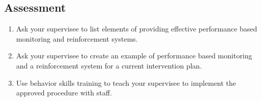 \subsection{Assessment}
\begin{enumerate}
\item Ask your supervisee to list elements of providing effective performance based monitoring and reinforcement systems. 
\item Ask your supervisee to create an example of performance based monitoring and a reinforcement system for a current intervention plan.
\item Use behavior skills training to teach your supervisee to implement the approved procedure with staff. 
%
\end{enumerate}
%

